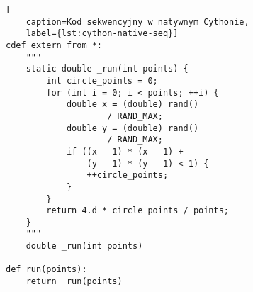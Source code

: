 \noindent\begin{minipage}{\columnwidth}
\begin{lstlisting}[
    caption=Kod sekwencyjny w natywnym Cythonie,
    label={lst:cython-native-seq}]
cdef extern from *:
    """
    static double _run(int points) {
        int circle_points = 0;
        for (int i = 0; i < points; ++i) {
            double x = (double) rand()
                    / RAND_MAX;
            double y = (double) rand()
                    / RAND_MAX;
            if ((x - 1) * (x - 1) +
                (y - 1) * (y - 1) < 1) {
                ++circle_points;
            }
        }
        return 4.d * circle_points / points;
    }
    """
    double _run(int points)

def run(points):
    return _run(points)
\end{lstlisting}
\end{minipage}

